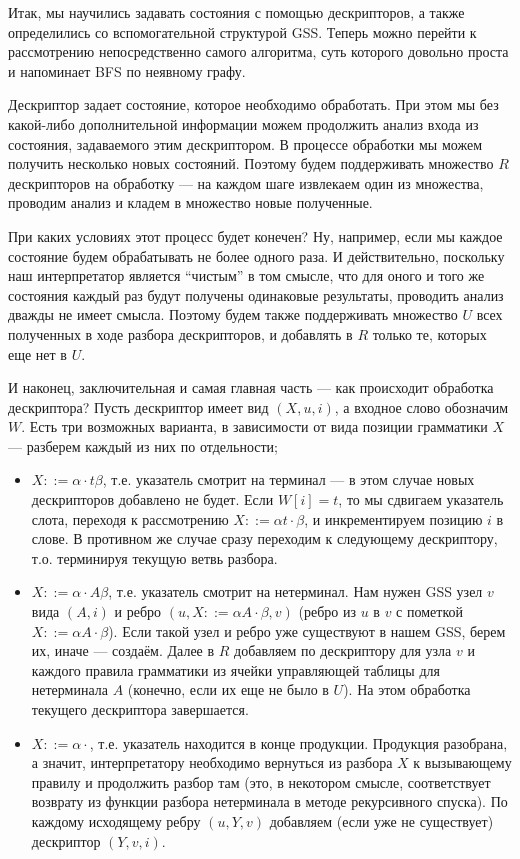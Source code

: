 Итак, мы научились задавать состояния с помощью дескрипторов, а также определились со вспомогательной структурой GSS. Теперь можно перейти к рассмотрению непосредственно самого алгоритма, суть которого довольно проста и напоминает BFS по неявному графу.

Дескриптор задает состояние, которое необходимо обработать. При этом мы без какой-либо дополнительной информации можем продолжить анализ входа из состояния, задаваемого этим дескриптором. В процессе обработки мы можем получить несколько новых состояний. Поэтому будем поддерживать множество $ R $ дескрипторов на обработку --- на каждом шаге извлекаем один из множества, проводим анализ и кладем в множество новые полученные.

При каких условиях этот процесс будет конечен? Ну, например, если мы каждое состояние будем обрабатывать не более одного раза. И действительно, поскольку наш интерпретатор является ``чистым'' в том смысле, что для оного и того же состояния каждый раз будут получены одинаковые результаты, проводить анализ дважды не имеет смысла. Поэтому будем также поддерживать множество $ U $ всех полученных в ходе разбора дескрипторов, и добавлять в $ R $ только те, которых еще нет в $ U $.

И наконец, заключительная и самая главная часть --- как происходит обработка дескриптора?
Пусть дескриптор имеет вид $ (X, u, i) $, а входное слово обозначим $ W $. Есть три возможных варианта, в зависимости от вида позиции грамматики $ X $ --- разберем каждый из них по отдельности;

\begin{itemize}
  \item $ X ::= \alpha \cdot t \beta $, т.е. указатель смотрит на терминал --- в этом случае новых дескрипторов добавлено не будет. Если $ W[i] = t $, то мы сдвигаем указатель слота, переходя к рассмотрению $ X ::= \alpha t \cdot \beta $, и инкрементируем позицию $ i $ в слове. В противном же случае сразу переходим к следующему дескриптору, т.о. терминируя текущую ветвь разбора.

  \item $ X ::= \alpha \cdot A \beta $, т.е. указатель смотрит на нетерминал. Нам нужен GSS узел $ v $ вида $ (A, i) $ и ребро $ (u, X ::= \alpha A \cdot \beta, v) $ (ребро из $ u $ в $ v $ с пометкой $ X ::= \alpha A \cdot \beta $). Если такой узел и ребро уже существуют в нашем GSS, берем их, иначе --- создаём. Далее в $ R $ добавляем по дескриптору для узла $ v $ и каждого правила грамматики из ячейки управляющей таблицы для нетерминала $ A $ (конечно, если их еще не было в $ U $). На этом обработка текущего дескриптора завершается.

  \item $ X ::= \alpha \cdot $, т.е. указатель находится в конце продукции. Продукция разобрана, а значит, интерпретатору необходимо вернуться из разбора $ X $ к вызывающему правилу и продолжить разбор там (это, в некотором смысле, соответствует возврату из функции разбора нетерминала в методе рекурсивного спуска). По каждому исходящему ребру $ (u, Y, v) $ добавляем (если уже не существует) дескриптор $(Y, v, i)$.
\end{itemize}

